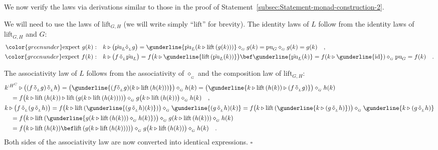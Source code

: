 We now verify the laws via derivations similar to those in the proof
of Statement~\ref{subsec:Statement-monad-construction-2}.

We will need to use the laws of $\text{lift}_{G,H}$ (we will write
simply \textsf{``}$\text{lift}$\textsf{''} for brevity). The identity laws of $L$
follow from the identity laws of $\text{lift}_{G,H}$ and $G$:
\begin{align*}
{\color{greenunder}\text{expect }g(k):}\quad & k\triangleright\big(\tilde{\text{pu}}_{L}\tilde{\diamond}_{_{L}}g\big)=\gunderline{\tilde{\text{pu}}_{L}(k\triangleright\text{lift}\,(g(k)))}\diamond_{_{G}}g(k)=\text{pu}_{G}\diamond_{_{G}}g(k)=g(k)\quad,\\
{\color{greenunder}\text{expect }f(k):}\quad & k\triangleright\big(f\,\tilde{\diamond}_{_{L}}\tilde{\text{pu}}_{L}\big)=f\big(k\triangleright\gunderline{\text{lift}\,(\tilde{\text{pu}}_{L}(k))}\big)\bef\gunderline{\tilde{\text{pu}}_{L}(k)}=f(k\triangleright\gunderline{\text{id}})\diamond_{_{G}}\text{pu}_{G}=f(k)\quad.
\end{align*}

The associativity law of $L$ follows from the associativity of $\diamond_{_{G}}$
and the composition law of $\text{lift}_{G,H}$:
\begin{align*}
 & k^{:H^{C}}\triangleright\big((f\,\tilde{\diamond}_{_{L}}g)\,\tilde{\diamond}_{_{L}}h\big)=\big(\gunderline{(f\tilde{\diamond}_{_{L}}g)(k\triangleright\text{lift}\,(h(k)))}\big)\diamond_{_{G}}h(k)=\big(\gunderline{k\triangleright\text{lift}\,(h(k))\triangleright(f\,\tilde{\diamond}_{_{L}}g)}\big)\diamond_{_{G}}h(k)\\
 & \quad=f\big(k\triangleright\text{lift}\,(h(k))\triangleright\text{lift}\,(g(k\triangleright\text{lift}\,(h(k))))\big)\diamond_{_{G}}g\big(k\triangleright\text{lift}\,(h(k))\big)\diamond_{_{G}}h(k)\quad,\\
 & k\triangleright\big(f\,\tilde{\diamond}_{_{L}}(g\,\tilde{\diamond}_{_{L}}h)\big)=f\big(k\triangleright\text{lift}\,(\gunderline{(g\,\tilde{\diamond}_{_{L}}h)(k)})\big)\diamond_{_{G}}\gunderline{(g\,\tilde{\diamond}_{_{L}}h)(k)}=f\big(k\triangleright\text{lift}\,(\gunderline{k\triangleright(g\,\tilde{\diamond}_{_{L}}h)})\big)\diamond_{_{G}}\gunderline{k\triangleright(g\,\tilde{\diamond}_{_{L}}h)}\\
 & \quad=f\big(k\triangleright\text{lift}\,(\gunderline{g(k\triangleright\text{lift}\,(h(k)))\diamond_{_{G}}h(k)})\big)\diamond_{_{G}}g(k\triangleright\text{lift}\,(h(k)))\diamond_{_{G}}h(k)\\
 & \quad=f\big(k\triangleright\text{lift}\,(h(k))\bef\text{lift}\,(g(k\triangleright\text{lift}\,(h(k))))\big)\diamond_{_{G}}g\big(k\triangleright\text{lift}\,(h(k))\big)\diamond_{_{G}}h(k)\quad.
\end{align*}
Both sides of the associativity law are now converted into identical
expressions. $\square$

